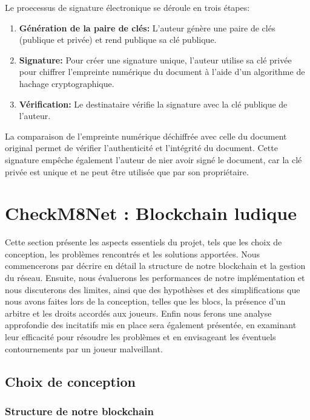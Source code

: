 \documentclass[journal, a4paper]{IEEEtran}
\begin{document}
		Le proecessus de signature électronique se déroule en trois étapes:
			\begin{enumerate}
				\item \textbf{Génération de la paire de clés:} L'auteur génère une paire de clés (publique et privée) et rend publique sa clé publique.
				\item \textbf{Signature:} Pour créer une signature unique, l'auteur utilise sa clé privée pour chiffrer l'empreinte numérique du document
				à l'aide d'un algorithme de hachage cryptographique.
				\item \textbf{Vérification:} Le destinataire vérifie la signature avec la clé publique de l'auteur.
			\end{enumerate}

		La comparaison de l'empreinte numérique déchiffrée avec celle du document original permet de vérifier l'authenticité et l'intégrité du document.
		Cette signature empêche également l'auteur de nier avoir signé le document, car la clé privée est unique et ne peut être utilisée que par son propriétaire.

\section{CheckM8Net : Blockchain ludique}\label{sec:checkm8net-:-blockchain-ludique}
	Cette section présente les aspects essentiels du projet, tels que les choix de conception, les problèmes rencontrés et les solutions apportées.
	Nous commencerons par décrire en détail la structure de notre blockchain et la gestion du réseau.
	Ensuite, nous évaluerons les performances de notre implémentation et nous discuterons des limites, ainsi que des hypothèses et
	des simplifications que nous avons faites lors de la conception, telles que les blocs, la présence d'un arbitre et les droits accordés aux joueurs.
	Enfin nous ferons une analyse approfondie des incitatifs mis en place sera également présentée, en examinant leur efficacité pour résoudre
	les problèmes et en envisageant les éventuels contournements par un joueur malveillant.

	\subsection{Choix de conception}\label{subsec:choix-de-conception}
		\begin{center}
			\subsubsection*{\textbf{Structure de notre blockchain}}\label{subsubsec:structure-de-notre-blockchain}
		\end{center}
\end{document}

